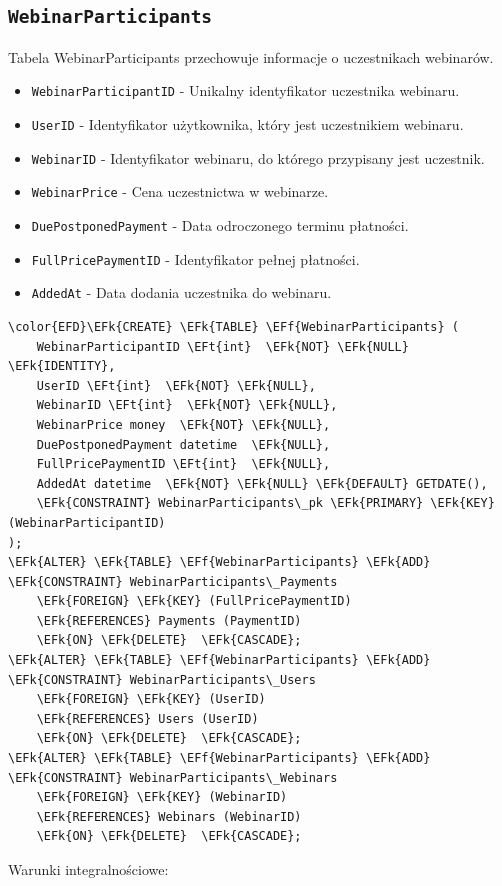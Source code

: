 \documentclass[11pt]{article}
\newcommand{\EFk}[1]{\textcolor{EFk}{\textbf{#1}}} %
\newcommand{\EFf}[1]{\textcolor{EFf}{#1}} %
\newcommand{\EFt}[1]{\textcolor{EFt}{\textbf{#1}}} %
\begin{document}
\subsection{\texttt{WebinarParticipants}}
\label{sec:org44cd8b7}
Tabela WebinarParticipants przechowuje informacje o uczestnikach webinarów.
\begin{itemize}
\item \texttt{WebinarParticipantID} - Unikalny identyfikator uczestnika webinaru.
\item \texttt{UserID} - Identyfikator użytkownika, który jest uczestnikiem webinaru.
\item \texttt{WebinarID} - Identyfikator webinaru, do którego przypisany jest uczestnik.
\item \texttt{WebinarPrice} - Cena uczestnictwa w webinarze.
\item \texttt{DuePostponedPayment} - Data odroczonego terminu płatności.
\item \texttt{FullPricePaymentID} - Identyfikator pełnej płatności.
\item \texttt{AddedAt} - Data dodania uczestnika do webinaru.
\end{itemize}
\begin{Code}
\begin{Verbatim}
\color{EFD}\EFk{CREATE} \EFk{TABLE} \EFf{WebinarParticipants} (
    WebinarParticipantID \EFt{int}  \EFk{NOT} \EFk{NULL} \EFk{IDENTITY},
    UserID \EFt{int}  \EFk{NOT} \EFk{NULL},
    WebinarID \EFt{int}  \EFk{NOT} \EFk{NULL},
    WebinarPrice money  \EFk{NOT} \EFk{NULL},
    DuePostponedPayment datetime  \EFk{NULL},
    FullPricePaymentID \EFt{int}  \EFk{NULL},
    AddedAt datetime  \EFk{NOT} \EFk{NULL} \EFk{DEFAULT} GETDATE(),
    \EFk{CONSTRAINT} WebinarParticipants\_pk \EFk{PRIMARY} \EFk{KEY}  (WebinarParticipantID)
);
\EFk{ALTER} \EFk{TABLE} \EFf{WebinarParticipants} \EFk{ADD} \EFk{CONSTRAINT} WebinarParticipants\_Payments
    \EFk{FOREIGN} \EFk{KEY} (FullPricePaymentID)
    \EFk{REFERENCES} Payments (PaymentID)
    \EFk{ON} \EFk{DELETE}  \EFk{CASCADE};
\EFk{ALTER} \EFk{TABLE} \EFf{WebinarParticipants} \EFk{ADD} \EFk{CONSTRAINT} WebinarParticipants\_Users
    \EFk{FOREIGN} \EFk{KEY} (UserID)
    \EFk{REFERENCES} Users (UserID)
    \EFk{ON} \EFk{DELETE}  \EFk{CASCADE};
\EFk{ALTER} \EFk{TABLE} \EFf{WebinarParticipants} \EFk{ADD} \EFk{CONSTRAINT} WebinarParticipants\_Webinars
    \EFk{FOREIGN} \EFk{KEY} (WebinarID)
    \EFk{REFERENCES} Webinars (WebinarID)
    \EFk{ON} \EFk{DELETE}  \EFk{CASCADE};
\end{Verbatim}
\end{Code}
Warunki integralnościowe:
\end{document}
